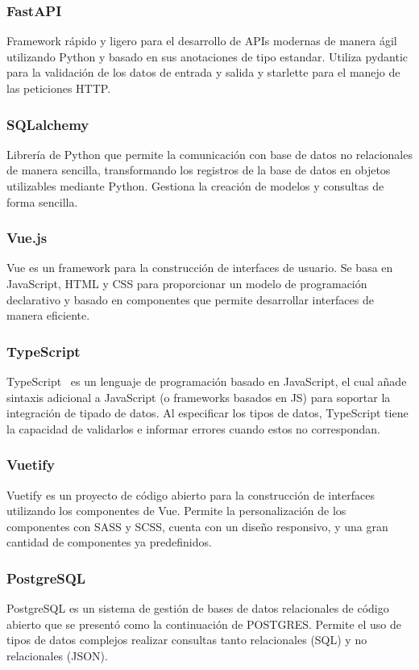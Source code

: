 \subsubsection{FastAPI}
Framework rápido  y ligero para el desarrollo de APIs modernas de manera ágil utilizando Python y basado en sus anotaciones de tipo estandar.
Utiliza pydantic para la validación de los datos de entrada y salida y starlette para el manejo de las peticiones HTTP. %
\subsubsection{SQLalchemy}
Librería de Python que permite la comunicación con base de datos no relacionales de manera sencilla, transformando los registros de la base de datos en objetos utilizables mediante Python. Gestiona la creación de modelos y consultas de forma sencilla.
\subsubsection{Vue.js}
Vue es un framework para la construcción de interfaces de usuario. Se basa en JavaScript, HTML y CSS para proporcionar un modelo de programación declarativo y basado en componentes que permite desarrollar interfaces de manera eficiente.
\subsubsection{TypeScript}  
TypeScript~\cite{bierman2014understanding} es un lenguaje de programación basado en JavaScript, el cual añade sintaxis adicional a JavaScript (o frameworks basados en JS) para soportar la integración de tipado de datos. Al especificar los tipos de datos, TypeScript tiene la capacidad de validarlos e informar errores cuando estos no correspondan.
\subsubsection{Vuetify}
Vuetify es un proyecto de código abierto para la construcción de interfaces utilizando los componentes de Vue. Permite la personalización de los componentes con SASS y SCSS, cuenta con un diseño responsivo, y una gran cantidad de componentes ya predefinidos.
\subsubsection{PostgreSQL}
PostgreSQL es un sistema de gestión de bases de datos relacionales de código abierto que se presentó como la continuación de POSTGRES. Permite el uso de tipos de datos complejos realizar consultas tanto relacionales (SQL) y no relacionales (JSON).

